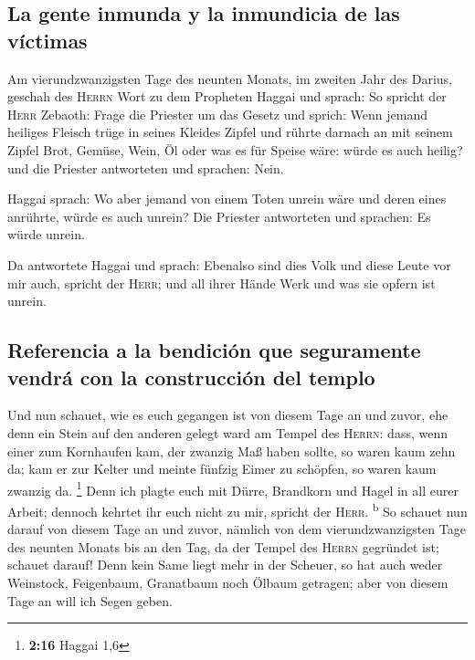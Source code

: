\hypertarget{la-gente-inmunda-y-la-inmundicia-de-las-vuxedctimas}{%
\subsection{La gente inmunda y la inmundicia de las
víctimas}\label{la-gente-inmunda-y-la-inmundicia-de-las-vuxedctimas}}

 Am vierundzwanzigsten Tage des neunten Monats, im
zweiten Jahr des Darius, geschah des \textsc{Herrn} Wort zu dem
Propheten Haggai und sprach:  So spricht der
\textsc{Herr} Zebaoth: Frage die Priester um das Gesetz und sprich:
 Wenn jemand heiliges Fleisch trüge in seines Kleides
Zipfel und rührte darnach an mit seinem Zipfel Brot, Gemüse, Wein, Öl
oder was es für Speise wäre: würde es auch heilig? und die Priester
antworteten und sprachen: Nein.

 Haggai sprach: Wo aber jemand von einem Toten unrein
wäre und deren eines anrührte, würde es auch unrein? Die Priester
antworteten und sprachen: Es würde unrein.

 Da antwortete Haggai und sprach: Ebenalso sind dies Volk
und diese Leute vor mir auch, spricht der \textsc{Herr}; und all ihrer
Hände Werk und was sie opfern ist unrein.

\hypertarget{referencia-a-la-bendiciuxf3n-que-seguramente-vendruxe1-con-la-construcciuxf3n-del-templo}{%
\subsection{Referencia a la bendición que seguramente vendrá con la
construcción del
templo}\label{referencia-a-la-bendiciuxf3n-que-seguramente-vendruxe1-con-la-construcciuxf3n-del-templo}}

 Und nun schauet, wie es euch gegangen ist von diesem
Tage an und zuvor, ehe denn ein Stein auf den anderen gelegt ward am
Tempel des \textsc{Herrn}:  dass, wenn einer zum
Kornhaufen kam, der zwanzig Maß haben sollte, so waren kaum zehn da; kam
er zur Kelter und meinte fünfzig Eimer zu schöpfen, so waren kaum
zwanzig da. \footnote{\textbf{2:16} Haggai 1,6}  Denn ich
plagte euch mit Dürre, Brandkorn und Hagel in all eurer Arbeit; dennoch
kehrtet ihr euch nicht zu mir, spricht der \textsc{Herr}.
\textsuperscript{b}  So schauet nun darauf von diesem
Tage an und zuvor, nämlich von dem vierundzwanzigsten Tage des neunten
Monats bis an den Tag, da der Tempel des \textsc{Herrn} gegründet ist;
schauet darauf!  Denn kein Same liegt mehr in der
Scheuer, so hat auch weder Weinstock, Feigenbaum, Granatbaum noch Ölbaum
getragen; aber von diesem Tage an will ich Segen geben.

